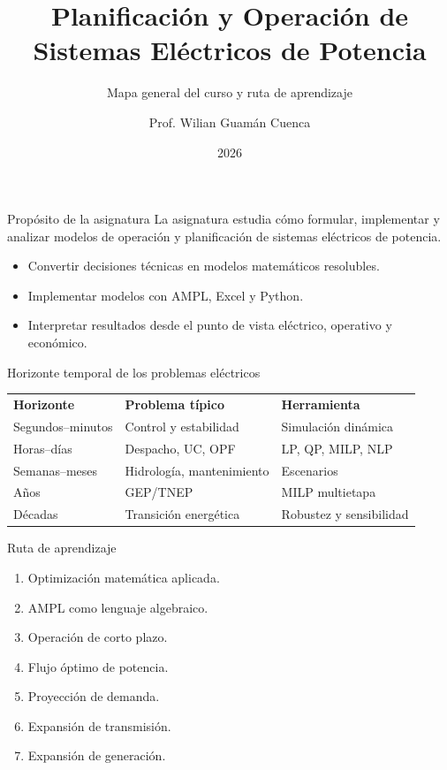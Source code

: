 \documentclass[aspectratio=169]{beamer}
\title{Planificación y Operación de Sistemas Eléctricos de Potencia}
\subtitle{Mapa general del curso y ruta de aprendizaje}
\author{Prof. Wilian Guamán Cuenca}
\date{2026}
\begin{document}
\begin{frame}\titlepage\end{frame}

\begin{frame}{Propósito de la asignatura}
La asignatura estudia cómo formular, implementar y analizar modelos de operación y planificación de sistemas eléctricos de potencia.
\vspace{0.3cm}
\begin{itemize}
\item Convertir decisiones técnicas en modelos matemáticos resolubles.
\item Implementar modelos con AMPL, Excel y Python.
\item Interpretar resultados desde el punto de vista eléctrico, operativo y económico.
\end{itemize}
\end{frame}

\begin{frame}{Horizonte temporal de los problemas eléctricos}
\begin{tabular}{lll}
\textbf{Horizonte} & \textbf{Problema típico} & \textbf{Herramienta}\\
Segundos--minutos & Control y estabilidad & Simulación dinámica\\
Horas--días & Despacho, UC, OPF & LP, QP, MILP, NLP\\
Semanas--meses & Hidrología, mantenimiento & Escenarios\\
Años & GEP/TNEP & MILP multietapa\\
Décadas & Transición energética & Robustez y sensibilidad\\
\end{tabular}
\end{frame}

\begin{frame}{Ruta de aprendizaje}
\begin{enumerate}
\item Optimización matemática aplicada.
\item AMPL como lenguaje algebraico.
\item Operación de corto plazo.
\item Flujo óptimo de potencia.
\item Proyección de demanda.
\item Expansión de transmisión.
\item Expansión de generación.
\end{enumerate}
\end{frame}
\end{document}
